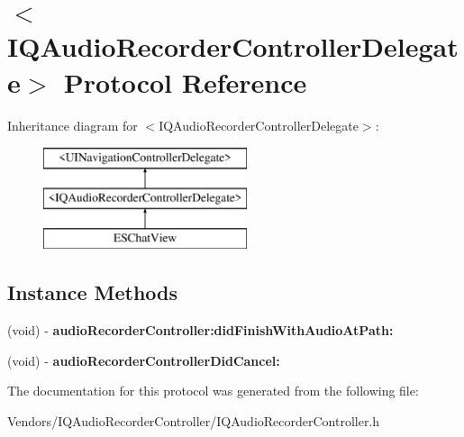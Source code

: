 \hypertarget{protocol_i_q_audio_recorder_controller_delegate-p}{}\section{$<$I\+Q\+Audio\+Recorder\+Controller\+Delegate$>$ Protocol Reference}
\label{protocol_i_q_audio_recorder_controller_delegate-p}
Inheritance diagram for $<$I\+Q\+Audio\+Recorder\+Controller\+Delegate$>$\+:\begin{figure}[H]
\begin{center}
\leavevmode
\includegraphics[height=3.000000cm]{protocol_i_q_audio_recorder_controller_delegate-p}
\end{center}
\end{figure}
\subsection*{Instance Methods}
\begin{DoxyCompactItemize}
\item 
\hypertarget{protocol_i_q_audio_recorder_controller_delegate-p_af823017eef43cb8bf732c45e756de4ef}{}(void) -\/ {\bfseries audio\+Recorder\+Controller\+:did\+Finish\+With\+Audio\+At\+Path\+:}\label{protocol_i_q_audio_recorder_controller_delegate-p_af823017eef43cb8bf732c45e756de4ef}

\item 
\hypertarget{protocol_i_q_audio_recorder_controller_delegate-p_ab218a3bdfd0943ca269fc5ca23e50d39}{}(void) -\/ {\bfseries audio\+Recorder\+Controller\+Did\+Cancel\+:}\label{protocol_i_q_audio_recorder_controller_delegate-p_ab218a3bdfd0943ca269fc5ca23e50d39}

\end{DoxyCompactItemize}


The documentation for this protocol was generated from the following file\+:\begin{DoxyCompactItemize}
\item 
Vendors/\+I\+Q\+Audio\+Recorder\+Controller/I\+Q\+Audio\+Recorder\+Controller.\+h\end{DoxyCompactItemize}
